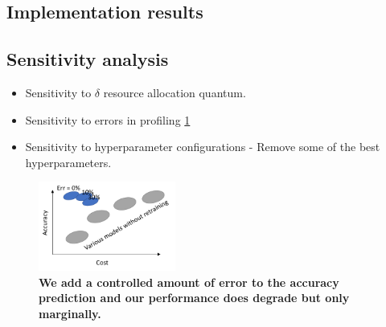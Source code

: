 


\subsection{Implementation results}

\subsection{Sensitivity analysis}
\begin{itemize}
    \item Sensitivity to $\delta$ resource allocation quantum. 
    \item Sensitivity to errors in profiling \cref{fig:sensitivity-accuracy-error}
    \item Sensitivity to hyperparameter configurations - Remove some of the best hyperparameters. 
\end{itemize}

\begin{figure}
	\includegraphics[width=0.4\textwidth]{figures/eval_placeholders/sensitivity-accuracy-error.pdf}
	\caption{\bf We add a controlled amount of error to the accuracy prediction and our performance does degrade but only marginally. }
	\label{fig:sensitivity-accuracy-error}
\end{figure}


